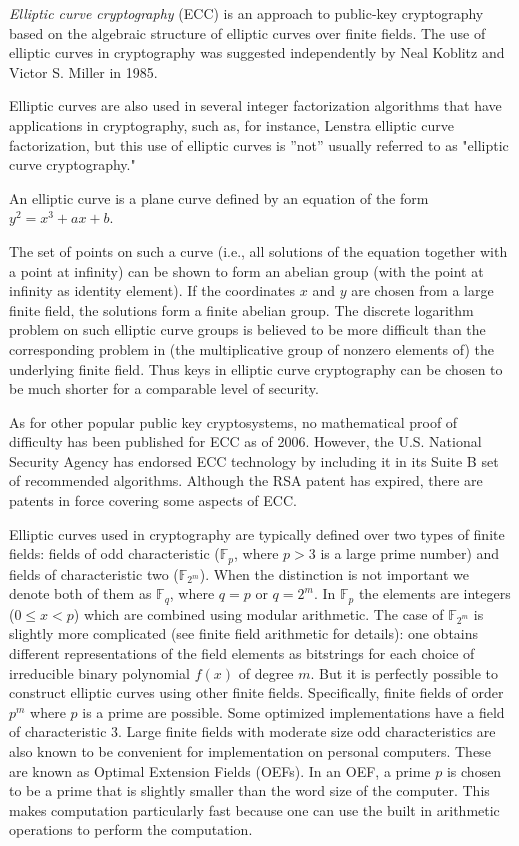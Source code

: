 \documentclass[12pt]{article}
\begin{document}
{\em Elliptic curve cryptography} (ECC) is an approach to public-key cryptography based on the algebraic structure of elliptic curves over finite fields. The use of elliptic curves in cryptography was suggested independently by Neal Koblitz and Victor S. Miller in 1985.

Elliptic curves are also used in several integer factorization algorithms that have applications in cryptography, such as, for instance, Lenstra elliptic curve factorization, but this use of elliptic curves is ''not'' usually referred to as "elliptic curve cryptography."

An elliptic curve is a plane curve defined by an equation of the form $y^2 = x^3 + a x + b$. 

The set of points on such a curve (i.e., all solutions of the equation together with a point at infinity) can be shown to form an abelian group (with the point at infinity as identity element). If the coordinates $x$ and $y$ are chosen from a large finite field, the solutions form a finite abelian group. The discrete logarithm problem on such elliptic curve groups is believed to be more difficult than the corresponding problem in (the multiplicative group of nonzero elements of) the underlying finite field. Thus keys in elliptic curve cryptography can be chosen to be much shorter for a comparable level of security. 

As for other popular public key cryptosystems, no mathematical proof of difficulty has been published for ECC as of 2006. However, the U.S. National Security Agency has endorsed ECC technology by including it in its Suite B set of recommended algorithms. Although the RSA patent has expired, there are patents in force covering some aspects of ECC.

Elliptic curves used in cryptography are typically defined over two types of finite fields: fields of odd characteristic ($\mathbb{F}_p$, where $p > 3$ is a large prime number) and fields of characteristic two ($\mathbb{F}_{2^m}$). When the distinction is not important we denote both of them as $\mathbb{F}_q$, where $q = p$ or $q = 2^m$. In $\mathbb{F}_p$ the elements are integers ($0 \le x < p$) which are combined using modular arithmetic. The case of $\mathbb{F}_{2^m}$ is slightly more complicated (see finite field arithmetic for details): one obtains different representations of the field elements as bitstrings for each choice of irreducible binary polynomial $f(x)$ of degree $m$. But it is perfectly possible to construct elliptic curves using other finite fields. Specifically, finite fields of order $p^m$ where $p$ is a prime are possible. Some optimized implementations have a field of characteristic 3. Large finite fields with moderate size odd characteristics are also known to be convenient for implementation on personal computers. These are known as Optimal Extension Fields (OEFs). In an OEF, a prime $p$ is chosen to be a prime that is slightly smaller than the word size of the computer. This makes computation particularly fast because one can use the built in arithmetic operations to perform the computation.
\end{document}
